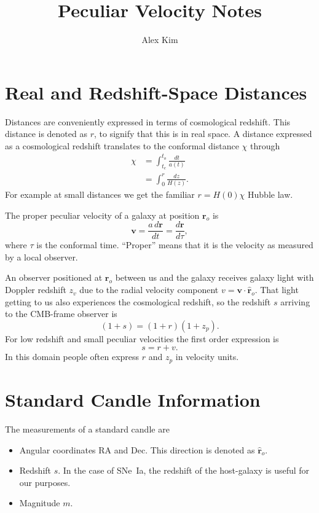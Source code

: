 \documentclass[11pt, oneside]{article}   	%
\title{Peculiar Velocity Notes}
\author{Alex Kim}
\begin{document}
\maketitle


\section{Real and Redshift-Space Distances}
\label{distances:sec}
Distances  are conveniently expressed
in terms of cosmological redshift.
This distance is denoted as $r$, to signify that this is in real space.
A distance expressed as a cosmological redshift  translates to the conformal distance $\chi$
through
\begin{align}
\chi & = \int_{t_e}^{t_o} \frac{dt}{a(t)} \\
&= \int_{0}^{r} \frac{dz}{H(z)}.
\end{align}
For example at small distances we get the familiar $r=H(0) \chi$ Hubble law.

The proper peculiar velocity of a galaxy at position $\mathbf{r}_o$ is
\begin{equation}
\mathbf{v} = \frac{a\,d\mathbf{r}}{dt}= \frac{d\mathbf{r}}{d\tau},
\end{equation}
where $\tau$ is the conformal time.  ``Proper'' means that it is the velocity as
measured by a local observer.

An observer positioned at $\mathbf{r}_o$ between us and the galaxy receives galaxy
light with  Doppler redshift $z_v$ due to the radial
velocity component $v=\mathbf{v} \cdot  \mathbf{\hat{r}}_o$.
That light getting to us also experiences the cosmological redshift, so  the redshift $s$
arriving to the CMB-frame observer is 
\begin{equation}
(1+s)  = (1+r)(1+z_p).
\end{equation}
For low redshift and small peculiar velocities the first order expression is
\begin{equation}
s  = r +v.
\end{equation}
In this domain people often express $r$ and $z_p$ in velocity units.


\section{Standard Candle Information}
The measurements of a standard candle are
\begin{itemize}
\item Angular coordinates RA and Dec.  This direction is denoted as $\mathbf{\hat{r}}_o$.
\item Redshift $s$. In the case of SNe~Ia, the redshift of the host-galaxy is useful for our purposes.
\item Magnitude $m$.
\end{itemize}
\end{document}
